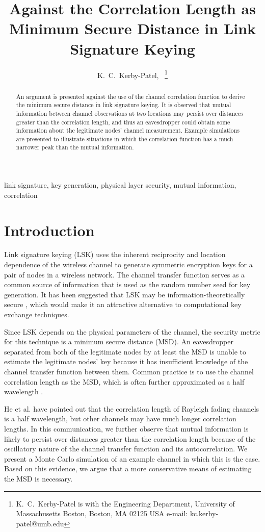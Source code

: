 \documentclass[journal]{IEEEtran}
\title{Against the Correlation Length as Minimum Secure Distance in Link Signature Keying}
\author{K.~C.~Kerby-Patel,~\IEEEmembership{Senior Member, IEEE}
\thanks{K.~C.~Kerby-Patel is with the Engineering Department, University of Massachusetts Boston, Boston, MA 02125 USA e-mail: kc.kerby-patel@umb.edu}}%
\begin{document}
\maketitle
\begin{abstract}
An argument is presented against the use of the channel correlation function to derive the minimum secure distance in link signature keying.  It is observed that mutual information between channel observations at two locations may persist over distances greater than the correlation length, and thus an eavesdropper could obtain some information about the legitimate nodes' channel measurement.  Example simulations are presented to illustrate situations in which the correlation function has a much narrower peak than the mutual information.
\end{abstract}
\begin{IEEEkeywords}
link signature, key generation, physical layer security, mutual information, correlation
\end{IEEEkeywords}
\IEEEpeerreviewmaketitle

\section{Introduction}
Link signature keying (LSK) uses the inherent reciprocity and location dependence of the wireless channel to generate symmetric encryption keys for a pair of nodes in a wireless network.  The channel transfer function serves as a common source of information that is used as the random number seed for key generation.  It has been suggested that LSK may be information-theoretically secure \cite{ye2010}, which would make it an attractive alternative to computational key exchange techniques.
	
Since LSK depends on the physical parameters of the channel, the security metric for this technique is a minimum secure distance (MSD).  An eavesdropper separated from both of the legitimate nodes by at least the MSD is unable to estimate the legitimate nodes' key because it has insufficient knowledge of the channel transfer function between them.  Common practice is to use the channel correlation length as the MSD, which is often further approximated as a half wavelength \cite{azimisadjadi2007, bloch2008, mathur2008, ye2010}. 

He et al. \cite{he2013} have pointed out that the correlation length of Rayleigh fading channels is a half wavelength, but other channels may have much longer correlation lengths.  In this communication, we further observe that mutual information is likely to persist over distances greater than the correlation length because of the oscillatory nature of the channel transfer function and its autocorrelation.  We present a Monte Carlo simulation of an example channel in which this is the case.  Based on this evidence, we argue that a more conservative means of estimating the MSD is necessary.
\end{document}
